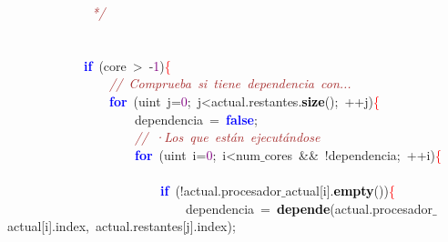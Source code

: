 \mbox{}\textit{\textcolor{Brown}{\ \ \ \ \ \ \ \ \ \ \ \ \ */}} \\
\mbox{} \\
\mbox{} \\
\mbox{}\ \ \ \ \ \ \ \ \ \ \ \ \textbf{\textcolor{Blue}{if}}\ \textcolor{BrickRed}{(}core\ \textcolor{BrickRed}{\textgreater{}}\ \textcolor{BrickRed}{-}\textcolor{Purple}{1}\textcolor{BrickRed}{)}\textcolor{Red}{\{} \\
\mbox{}\ \ \ \ \ \ \ \ \ \ \ \ \ \ \ \ \textit{\textcolor{Brown}{//\ Comprueba\ si\ tiene\ dependencia\ con...}} \\
\mbox{}\ \ \ \ \ \ \ \ \ \ \ \ \ \ \ \ \textbf{\textcolor{Blue}{for}}\ \textcolor{BrickRed}{(}\textcolor{TealBlue}{uint}\ j\textcolor{BrickRed}{=}\textcolor{Purple}{0}\textcolor{BrickRed}{;}\ j\textcolor{BrickRed}{\textless{}}actual\textcolor{BrickRed}{.}restantes\textcolor{BrickRed}{.}\textbf{\textcolor{Black}{size}}\textcolor{BrickRed}{();}\ \textcolor{BrickRed}{++}j\textcolor{BrickRed}{)}\textcolor{Red}{\{} \\
\mbox{}\ \ \ \ \ \ \ \ \ \ \ \ \ \ \ \ \ \ \ \ dependencia\ \textcolor{BrickRed}{=}\ \textbf{\textcolor{Blue}{false}}\textcolor{BrickRed}{;} \\
\mbox{}\ \ \ \ \ \ \ \ \ \ \ \ \ \ \ \ \ \ \ \ \textit{\textcolor{Brown}{//\ ·Los\ que\ están\ ejecutándose}} \\
\mbox{}\ \ \ \ \ \ \ \ \ \ \ \ \ \ \ \ \ \ \ \ \textbf{\textcolor{Blue}{for}}\ \textcolor{BrickRed}{(}\textcolor{TealBlue}{uint}\ i\textcolor{BrickRed}{=}\textcolor{Purple}{0}\textcolor{BrickRed}{;}\ i\textcolor{BrickRed}{\textless{}}num$\_$cores\ \textcolor{BrickRed}{\&\&}\ \textcolor{BrickRed}{!}dependencia\textcolor{BrickRed}{;}\ \textcolor{BrickRed}{++}i\textcolor{BrickRed}{)}\textcolor{Red}{\{} \\
\mbox{} \\
\mbox{}\ \ \ \ \ \ \ \ \ \ \ \ \ \ \ \ \ \ \ \ \ \ \ \ \textbf{\textcolor{Blue}{if}}\ \textcolor{BrickRed}{(!}actual\textcolor{BrickRed}{.}procesador$\_$actual\textcolor{BrickRed}{[}i\textcolor{BrickRed}{].}\textbf{\textcolor{Black}{empty}}\textcolor{BrickRed}{())}\textcolor{Red}{\{} \\
\mbox{}\ \ \ \ \ \ \ \ \ \ \ \ \ \ \ \ \ \ \ \ \ \ \ \ \ \ \ \ dependencia\ \textcolor{BrickRed}{=}\ \textbf{\textcolor{Black}{depende}}\textcolor{BrickRed}{(}actual\textcolor{BrickRed}{.}procesador$\_$actual\textcolor{BrickRed}{[}i\textcolor{BrickRed}{].}index\textcolor{BrickRed}{,}\ actual\textcolor{BrickRed}{.}restantes\textcolor{BrickRed}{[}j\textcolor{BrickRed}{].}index\textcolor{BrickRed}{);} \\
